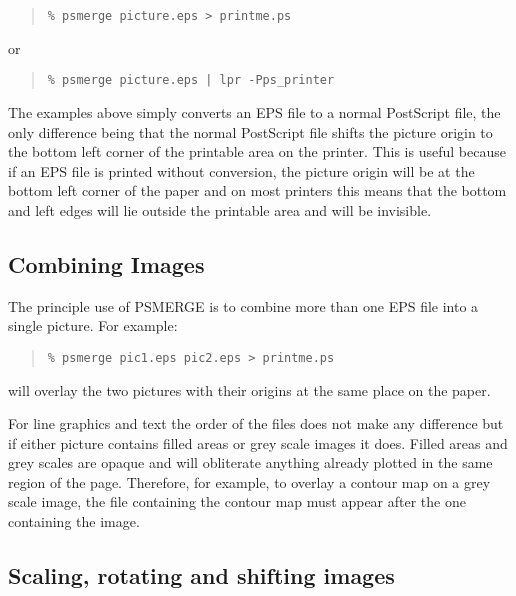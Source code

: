 \documentclass[twoside,11pt]{article}
\newcommand{\xlabel}[1]{}
\begin{document}
\begin{quote}\begin{verbatim}
% psmerge picture.eps > printme.ps
\end{verbatim}\end{quote}
or
\begin{quote}\begin{verbatim}
% psmerge picture.eps | lpr -Pps_printer
\end{verbatim}\end{quote}

The examples above simply converts an EPS file to a normal PostScript
file, the only difference being that the normal PostScript file shifts
the picture origin to the bottom left corner of the printable area on
the printer.  This is useful because if an EPS file is printed without
conversion, the picture origin will be at the bottom left corner of the
paper and on most printers this means that the bottom and left edges
will lie outside the printable area and will be invisible.

\subsection{\xlabel{combining_images}Combining Images}
\label{combining_images}

The principle use of PSMERGE is to combine more than one EPS file into a
single picture.  For example:

\begin{quote}\begin{verbatim}
% psmerge pic1.eps pic2.eps > printme.ps
\end{verbatim}\end{quote}

will overlay the two pictures with their origins at the same place on
the paper.  

For line graphics and text the order of the files does not make any
difference but if either picture contains filled areas or grey scale
images it does.  Filled areas and grey scales are opaque and will
obliterate anything already plotted in the same region of the page.
Therefore, for example, to overlay a contour map on a grey scale image,
the file containing the contour map must appear after the one
containing the image.

\subsection{\xlabel{scaling_rotating_and_shifting}%
Scaling, rotating and shifting images}
\label{scaling_rotating_and_shifting}
\end{document}
